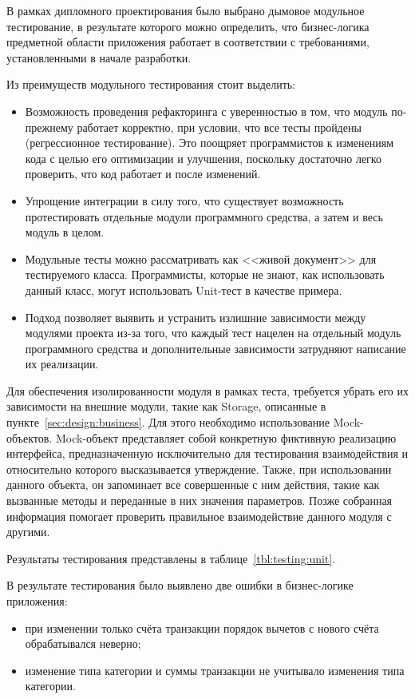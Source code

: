 В рамках дипломного проектирования было выбрано дымовое модульное тестирование, в результате которого можно определить, что бизнес-логика предметной области приложения работает в соответствии с требованиями, установленными в начале разработки.

Из преимуществ модульного тестирования стоит выделить:
\begin{itemize}
    \item Возможность проведения рефакторинга с уверенностью в том, что модуль по-прежнему работает корректно, при условии, что все тесты пройдены (регрессионное тестирование).
    Это поощряет программистов к изменениям кода с целью его оптимизации и улучшения, поскольку достаточно легко проверить, что код работает и после изменений.
    \item Упрощение интеграции в силу того, что существует возможность протестировать отдельные модули программного средства, а затем и весь модуль в целом.
    \item Модульные тесты можно рассматривать как <<живой документ>> для тестируемого класса.
    Программисты, которые не знают, как использовать данный класс, могут использовать Unit-тест в качестве примера.
    \item Подход позволяет выявить и устранить излишние зависимости между модулями проекта из-за того, что каждый тест нацелен на отдельный модуль программного средства и дополнительные зависимости затрудняют написание их реализации.
\end{itemize}

Для обеспечения изолированности модуля в рамках теста, требуется убрать его их зависимости на внешние модули, такие как Storage, описанные в пункте~\ref{sec:design:business}.
Для этого необходимо использование Mock-объектов.
Mock-объект представляет собой конкретную фиктивную реализацию интерфейса, предназначенную исключительно для тестирования взаимодействия и относительно которого высказывается утверждение.
Также, при использовании данного объекта, он запоминает все совершенные с ним действия, такие как вызванные методы и переданные в них значения параметров.
Позже собранная информация помогает проверить правильное взаимодействие данного модуля с другими.

Результаты тестирования представлены в таблице~\ref{tbl:testing:unit}.

В результате тестирования было выявлено две ошибки в бизнес-логике приложения:
\begin{itemize}
    \item при изменении только счёта транзакции порядок вычетов с нового счёта обрабатывался неверно;
    \item изменение типа категории и суммы транзакции не учитывало изменения типа категории.
\end{itemize}

